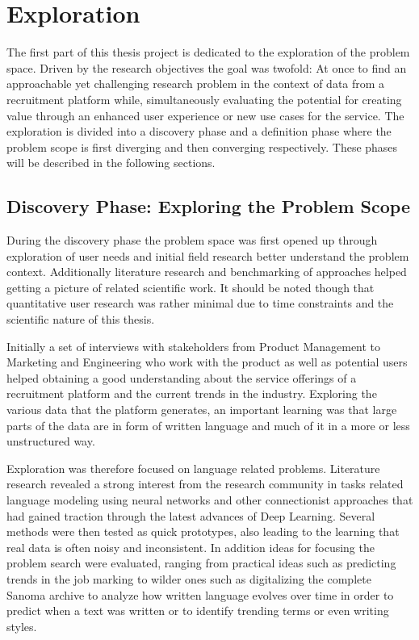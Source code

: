 
\clearpage

\section{Exploration}
\label{sec:Exploration}

The first part of this thesis project is dedicated to the exploration of the problem space. Driven by the research objectives the goal was twofold: At once to find an approachable yet challenging research problem in the context of data from a recruitment platform while, simultaneously evaluating the potential for creating value through an enhanced user experience or new use cases for the service. The exploration is divided into a discovery phase and a definition phase where the problem scope is first diverging and then converging respectively. These phases will be described in the following sections.

\subsection{Discovery Phase: Exploring the Problem Scope}
\label{Discovery Phase: Exploring the Problem Scope}

During the discovery phase the problem space was first opened up through exploration of user needs and initial field research better understand the problem context. Additionally literature research and benchmarking of approaches helped getting a picture of related scientific work. It should be noted though that quantitative user research was rather minimal due to time constraints and the scientific nature of this thesis.

Initially a set of interviews with stakeholders from Product Management to Marketing and Engineering who work with the product as well as potential users helped obtaining a good understanding about the service offerings of a recruitment platform and the current trends in the industry. Exploring the various data that the platform generates, an important learning was that large parts of the data are in form of written language and much of it in a more or less unstructured way.

Exploration was therefore focused on language related problems. Literature research revealed a strong interest from the research community in tasks related language modeling using neural networks and other connectionist approaches that had gained traction through the latest advances of \gls{Deep Learning}. Several methods were then tested as quick prototypes, also leading to the learning that real data is often noisy and inconsistent. In addition ideas for focusing the problem search were evaluated, ranging from practical ideas such as predicting trends in the job marking to wilder ones such as digitalizing the complete Sanoma archive to analyze how written language evolves over time in order to predict when a text was written or to identify trending terms or even writing styles.

